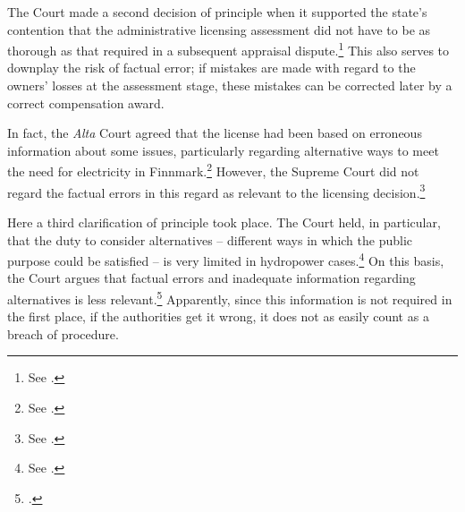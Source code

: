 The Court made a second decision of principle when it supported the state's contention that the administrative licensing assessment did not have to be as thorough as that required in a subsequent appraisal dispute.\footnote{See \cite[279|330]{alta82}.} This also serves to downplay the risk of factual error; if mistakes are made with regard to the owners' losses at the assessment stage, these mistakes can be corrected later by a correct compensation award.


In fact, the {\it Alta} Court agreed that the license had been based on erroneous information about some issues, particularly regarding alternative ways to meet the need for electricity in Finnmark.\footnote{See \cite[346-357]{alta82}.} However, the Supreme Court did not regard the factual errors in this regard as relevant to the licensing decision.\footnote{See \cite[346]{alta82}.} 

Here a third clarification of principle took place. The Court held, in particular, that the duty to consider alternatives -- different ways in which the public purpose could be satisfied -- is very limited in hydropower cases.\footnote{See \cite[346]{alta82}.} On this basis, the Court argues that factual errors and inadequate information regarding alternatives is less relevant.\footcite[346]{alta82} Apparently, since this information is not required in the first place, if the authorities get it wrong, it does not as easily count as a breach of procedure.

